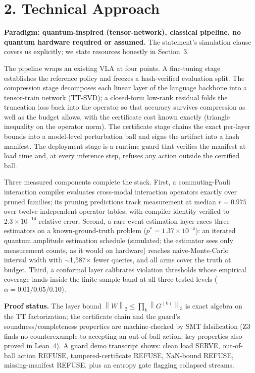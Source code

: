 \documentclass[10pt]{article}
\newcommand{\norm}[1]{\left\lVert #1 \right\rVert}
\begin{document}
\section*{2. Technical Approach}
\textbf{Paradigm: quantum-inspired (tensor-network), classical pipeline,
no quantum hardware required or assumed.} The statement's simulation clause
covers us explicitly; we state resources honestly in Section~3.

The pipeline wraps an existing VLA at four points. A fine-tuning stage
establishes the reference policy and freezes a hash-verified evaluation split.
The compression stage decomposes each linear layer of the language backbone
into a tensor-train network (TT-SVD); a closed-form low-rank residual folds
the truncation loss back into the operator so that accuracy survives
compression as well as the budget allows, with the certificate cost known
exactly (triangle inequality on the operator norm). The certificate stage
chains the exact per-layer bounds into a model-level perturbation ball and
signs the artifact into a hash manifest. The deployment stage is a runtime
guard that verifies the manifest at load time and, at every inference step,
refuses any action outside the certified ball.

Three measured components complete the stack. First, a commuting-Pauli
interaction compiler evaluates cross-modal interaction operators exactly over
pruned families; its pruning predictions track measurement at median
$r = 0.975$ over twelve independent operator tables, with compiler identity
verified to $2.3\times10^{-14}$ relative error. Second, a rare-event
estimation layer races three estimators on a known-ground-truth problem
($p^{*}=1.37\times10^{-4}$): an iterated quantum amplitude estimation schedule
(simulated; the estimator sees only measurement counts, as it would on
hardware) reaches naive-Monte-Carlo interval width with
$\sim$1{,}587$\times$ fewer queries, and all arms cover the truth at budget.
Third, a conformal layer calibrates violation thresholds whose empirical
coverage lands inside the finite-sample band at all three tested levels
($\alpha = 0.01/0.05/0.10$).

\textbf{Proof status.} The layer bound $\norm{W}_{2} \le \prod_k
\norm{G^{(k)}}_{3}$ is exact algebra on the TT factorization; the certificate
chain and the guard's soundness/completeness properties are machine-checked
by SMT falsification (Z3 finds no counterexample to accepting an out-of-ball
action; key properties also proved in Lean~4). A guard demo transcript shows: clean load SERVE,
out-of-ball action REFUSE, tampered-certificate REFUSE, NaN-bound REFUSE,
missing-manifest REFUSE, plus an entropy gate flagging collapsed streams.
\end{document}
